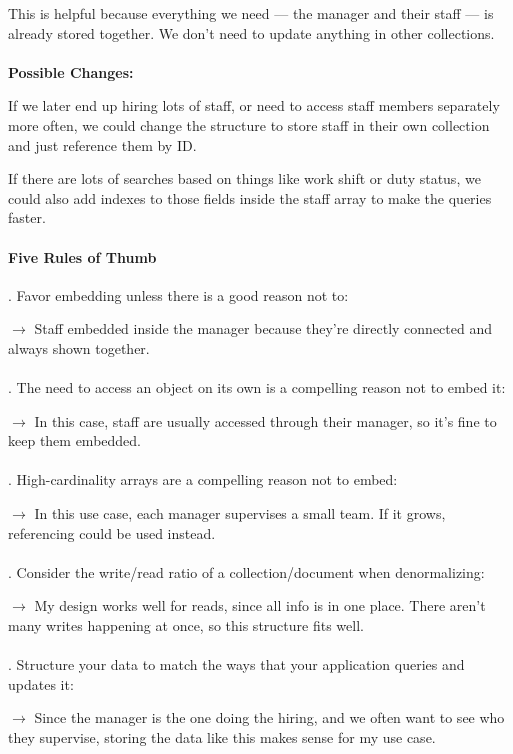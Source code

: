 \documentclass[a4paper, 11pt]{article}          %
\begin{document}
This is helpful because everything we need — the manager and their staff — is already stored together. We don’t need to update anything in other collections.
\\
\\
\textbf{Possible Changes:}
\par
If we later end up hiring lots of staff, or need to access staff members separately more often, we could change the structure to store staff in their own collection and just reference them by ID.

If there are lots of searches based on things like work shift or duty status, we could also add indexes to those fields inside the staff array to make the queries faster.

\paragraph*{Five Rules of Thumb}
. Favor embedding unless there is a good reason not to:
\par
$\to$ Staff embedded inside the manager because they're directly connected and always shown together.
\\
\\
. The need to access an object on its own is a compelling reason not to embed it:
\par
$\to$ In this case, staff are usually accessed through their manager, so it’s fine to keep them embedded.
\\
\\
. High-cardinality arrays are a compelling reason not to embed:
\par
$\to$ In this use case, each manager supervises a small team. If it grows, referencing could be used instead.
\\
\\
. Consider the write/read ratio of a collection/document when denormalizing:
\par
$\to$ My design works well for reads, since all info is in one place. There aren’t many writes happening at once, so this structure fits well.
\\
\\
. Structure your data to match the ways that your application queries and updates it:
\par
$\to$ Since the manager is the one doing the hiring, and we often want to see who they supervise, storing the data like this makes sense for my use case.
\end{document}

